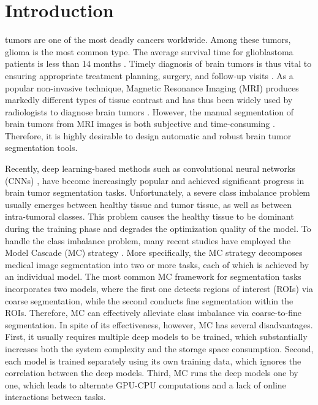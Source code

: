 \documentclass[journal,twoside]{IEEEtran}
\begin{document}
\section{Introduction}

 tumors are one of the most deadly cancers worldwide. Among these tumors, glioma is the most common type\cite{icsin2016review}. The average survival time for glioblastoma patients is less than 14 months \cite{van2010exciting}. Timely diagnosis of brain tumors is thus vital to ensuring appropriate treatment planning, surgery, and follow-up visits \cite{menze2015multimodal}. As a popular non-invasive technique, Magnetic Resonance Imaging (MRI)  produces markedly different types of tissue contrast and has thus been widely used by radiologists to diagnose brain tumors \cite{bauer2013survey}. However, the manual segmentation of brain tumors from MRI images is both subjective and time-consuming \cite{pereira2016brain}. Therefore, it is highly desirable to design automatic and robust brain tumor segmentation tools.






Recently, deep learning-based methods such as convolutional neural networks (CNNs) \cite{pereira2016brain,havaei2017brain,kamnitsas2017efficient,long2015fully,ronneberger2015u,chen2018voxresnet,zhao2018deep,kamnitsas2017ensembles,saha2018her2net,farag2017bottom,myronenko20183d,fehri2019bayesian,xiang2018automatic,zhou2018learning}, have become increasingly popular and achieved significant progress in brain tumor segmentation tasks. Unfortunately, a severe class imbalance problem usually emerges between healthy tissue and tumor tissue, as well as between intra-tumoral classes. This problem causes the healthy tissue to be dominant during the training phase and degrades the optimization quality of the model. To handle the class imbalance problem, many recent studies have employed the Model Cascade (MC) strategy 
\cite{haghighi2018automatic,hu2017detection,christ2016automatic,zhu20173d,lessmann2018automatic,zhang2017detecting,guo2017framework,tang2017scene,wang2017automatic}. More specifically, the MC strategy decomposes medical image segmentation into two or more tasks, each of which is achieved by an individual model. The most common MC framework for segmentation tasks \cite{haghighi2018automatic,hu2017detection,christ2016automatic,zhu20173d,lessmann2018automatic,zhang2017detecting,guo2017framework} incorporates two models, where the first one detects regions of interest (ROIs) via coarse segmentation, while the second conducts fine segmentation within the ROIs. Therefore, MC can effectively alleviate class imbalance via coarse-to-fine segmentation. In spite of its effectiveness, however, MC has several disadvantages. First, it usually requires multiple deep models to be trained, which substantially increases both the system complexity and the storage space consumption. Second, each model is trained separately using its own training data, which ignores the correlation between the deep models. Third, MC runs the deep models one by one, which leads to alternate GPU-CPU computations and a lack of online interactions between tasks. 
\end{document}
